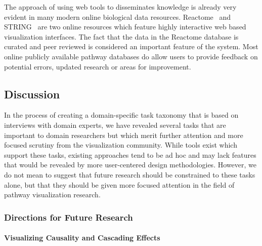 \documentclass[twocolumn]{bmcart}%
\begin{document}


The approach of using web tools to disseminates knowledge is already very evident in many modern online biological data resources.
Reactome~\cite{croft2014reactome} and STRING~\cite{STRING2005} are two online resources which feature highly interactive web based visualization interfaces.
The fact that the data in the Reactome database is curated and peer reviewed is considered an important feature of the system.
Most online publicly available pathway databases do allow users to provide feedback on potential errors, updated research or areas for improvement.




\subsection*{Discussion}

In the process of creating a domain-specific task taxonomy that is based on interviews with domain experts, we have revealed several tasks that are important to domain researchers but which merit further attention and more focused scrutiny from the visualization community.
While tools exist which support these tasks, existing approaches tend to be ad hoc and may lack features that would be revealed by more user-centered design methodologies.
However, we do not mean to suggest that future research should be constrained to these tasks alone, but that they should be given more focused attention in the field of pathway visualization research.

\subsubsection*{Directions for Future Research}

\paragraph{Visualizing Causality and Cascading Effects}
\end{document}
